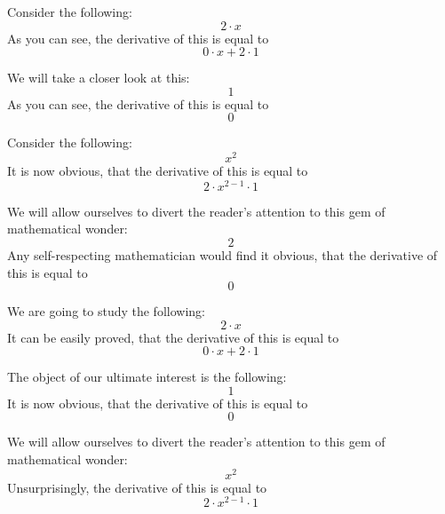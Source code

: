 \documentclass{article}
\begin{document}
Consider the following:
\begin{equation}
2 \cdot x 
\end{equation}
As you can see, the derivative of this is equal to
\begin{equation}
0 \cdot x + 2 \cdot 1 
\end{equation}

We will take a closer look at this:
\begin{equation}
1 
\end{equation}
As you can see, the derivative of this is equal to
\begin{equation}
0 
\end{equation}

Consider the following:
\begin{equation}
x ^{2 } 
\end{equation}
It is now obvious, that the derivative of this is equal to
\begin{equation}
2 \cdot x ^{2 - 1 } \cdot 1 
\end{equation}

We will allow ourselves to divert the reader's attention to this gem of mathematical wonder:
\begin{equation}
2 
\end{equation}
Any self-respecting mathematician would find it obvious, that the derivative of this is equal to
\begin{equation}
0 
\end{equation}

We are going to study the following:
\begin{equation}
2 \cdot x 
\end{equation}
It can be easily proved, that the derivative of this is equal to
\begin{equation}
0 \cdot x + 2 \cdot 1 
\end{equation}

The object of our ultimate interest is the following:
\begin{equation}
1 
\end{equation}
It is now obvious, that the derivative of this is equal to
\begin{equation}
0 
\end{equation}

We will allow ourselves to divert the reader's attention to this gem of mathematical wonder:
\begin{equation}
x ^{2 } 
\end{equation}
Unsurprisingly, the derivative of this is equal to
\begin{equation}
2 \cdot x ^{2 - 1 } \cdot 1 
\end{equation}
\end{document}
